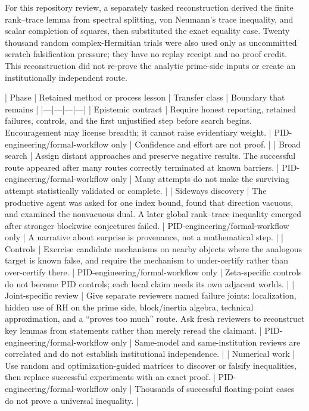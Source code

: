 \documentclass[11pt]{article}
\begin{document}
\begin{markdown}
For this repository review, a separately tasked reconstruction derived the finite rank--trace
lemma from spectral splitting, von Neumann's trace inequality, and scalar completion of squares,
then substituted the exact equality case. Twenty thousand random complex-Hermitian trials were
also used only as uncommitted scratch falsification pressure; they have no replay receipt and no
proof credit. This reconstruction did not re-prove the analytic prime-side inputs or create an
institutionally independent route.

| Phase | Retained method or process lesson | Transfer class | Boundary that remains |
|---|---|---|---|
| Epistemic contract | Require honest reporting, retained failures, controls, and the first unjustified step before search begins. Encouragement may license breadth; it cannot raise evidentiary weight. | PID-engineering/formal-workflow only | Confidence and effort are not proof. |
| Broad search | Assign distant approaches and preserve negative results. The successful route appeared after many routes correctly terminated at known barriers. | PID-engineering/formal-workflow only | Many attempts do not make the surviving attempt statistically validated or complete. |
| Sideways discovery | The productive agent was asked for one index bound, found that direction vacuous, and examined the nonvacuous dual. A later global rank--trace inequality emerged after stronger blockwise conjectures failed. | PID-engineering/formal-workflow only | A narrative about surprise is provenance, not a mathematical step. |
| Controls | Exercise candidate mechanisms on nearby objects where the analogous target is known false, and require the mechanism to under-certify rather than over-certify there. | PID-engineering/formal-workflow only | Zeta-specific controls do not become PID controls; each local claim needs its own adjacent worlds. |
| Joint-specific review | Give separate reviewers named failure joints: localization, hidden use of RH on the prime side, block/inertia algebra, technical approximation, and a “proves too much” route. Ask fresh reviewers to reconstruct key lemmas from statements rather than merely reread the claimant. | PID-engineering/formal-workflow only | Same-model and same-institution reviews are correlated and do not establish institutional independence. |
| Numerical work | Use random and optimization-guided matrices to discover or falsify inequalities, then replace successful experiments with an exact proof. | PID-engineering/formal-workflow only | Thousands of successful floating-point cases do not prove a universal inequality. |

\end{markdown}
\end{document}

